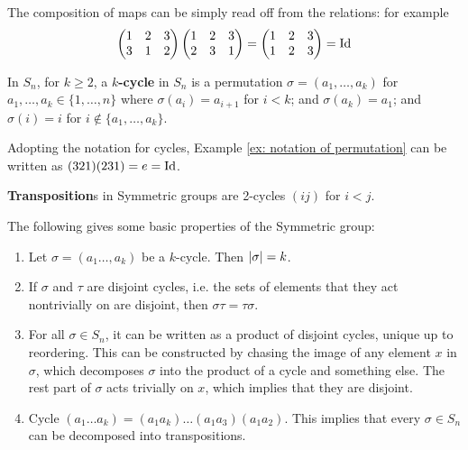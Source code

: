 \documentclass{article}
\begin{document}
\begin{example}\label{ex: notation of permutation}
    The composition of maps can be simply read off from the relations: for example
    \[
        \begin{pmatrix}
            1 & 2 & 3 \\
            3 & 1 & 2 \\
        \end{pmatrix}
        \begin{pmatrix}
            1 & 2 & 3 \\
            2 & 3 & 1 \\
        \end{pmatrix} = 
        \begin{pmatrix}
            1 & 2 & 3 \\
            1 & 2 & 3 \\
        \end{pmatrix} = \mathrm{Id}
    \]
\end{example}

\begin{definition}[Cycle]
    In $S_n$, for $k \geq 2$, a \textbf{$k$-cycle} in $S_n$ is a permutation $\sigma = (a_1, \dots, a_k)$ for $a_1, \dots, a_k \in \{1, \dots, n\}$ where $\sigma(a_i) = a_{i+1}$ for $i < k$; and $\sigma(a_k) = a_1$; and $\sigma(i) = i$ for $i \notin \{a_1, \dots, a_k\}$.
\end{definition}

\begin{example}\label{ex: notation of permutation using cycles}
    Adopting the notation for cycles, Example \ref{ex: notation of permutation} can be written as $(3 2 1)(2 3 1) = e = \mathrm{Id}$.
\end{example}

\begin{definition}[Transposition]
    \textbf{Transposition}s in Symmetric groups are 2-cycles $(i j)$ for $i < j$.
\end{definition}

\begin{remark}\label{rmk: basic properties of symmetric group}
    The following gives some basic properties of the Symmetric group:
    \begin{enumerate}
        \item Let $\sigma = (a_1 \dots, a_k)$ be a $k$-cycle. Then $\left|\sigma\right| = k$.
        \item If $\sigma$ and $\tau$ are disjoint cycles, i.e. the sets of elements that they act nontrivially on are disjoint, then $\sigma\tau = \tau\sigma$.
        \item For all $\sigma \in S_n$, it can be written as a product of disjoint cycles, unique up to reordering. This can be constructed by chasing the image of any element $x$ in $\sigma$, which decomposes $\sigma$ into the product of a cycle and something else. The rest part of $\sigma$ acts trivially on $x$, which implies that they are disjoint.
        \item Cycle $(a_1 \dots a_k) = (a_1 a_k)\dots (a_1 a_3) (a_1 a_2)$. This implies that every $\sigma \in S_n$ can be decomposed into transpositions.
    \end{enumerate}
\end{remark}
\end{document}
